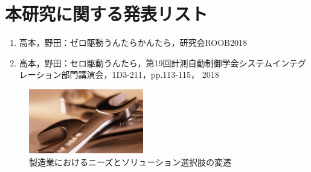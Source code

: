 \documentclass[10pt,twocolumn]{jsarticle}
\begin{document}
\section*{本研究に関する発表リスト}
\begin{enumerate}
\renewcommand{\labelenumi}{[\arabic{enumi}]}
\item
高本，野田：ゼロ駆動うんたらかんたら，研究会ROOB2018

\item
高本，野田：セロ駆動うんたら，第19回計測自動制御学会システムインテグレーション部門講演会，1D3-211，pp.113-115， 2018

\end{enumerate}

\begin{figure}[b]\centering \includegraphics[width=5cm]{Fig/ChangesInManufacturing.pdf}
\caption{製造業におけるニーズとソリューション選択肢の変遷}\label{fig:ChangesInManufacturing}\end{figure}
\fi

\small


\normalsize
\end{document}
